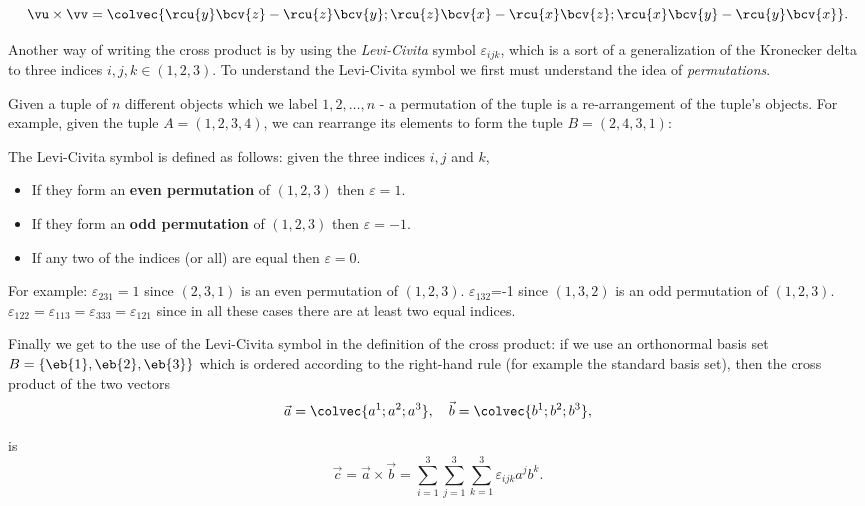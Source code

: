 \begin{equation}
  \vu\times\vv = \colvec{\rcu{y}\bcv{z}-\rcu{z}\bcv{y};\rcu{z}\bcv{x}-\rcu{x}\bcv{z};\rcu{x}\bcv{y}-\rcu{y}\bcv{x}}.
	\label{eq:cross product calculation}
\end{equation}

Another way of writing the cross product is by using the \emph{Levi-Civita} symbol $\varepsilon_{ijk}$, which is a sort of a generalization of the Kronecker delta to three indices $i,j,k\in\left(1,2,3\right)$. To understand the Levi-Civita symbol we first must understand the idea of \emph{permutations}.

Given a tuple of $n$ different objects which we label $1,2,\dots,n$ - a permutation of the tuple is a re-arrangement of the tuple's objects. For example, given the tuple $A=\left(1,2,3,4\right)$, we can rearrange its elements to form the tuple $B=\left(2,4,3,1\right)$:


The Levi-Civita symbol is defined as follows: given the three indices $i,j$ and $k$,
\begin{itemize}
  \item If they form an \textbf{even permutation} of $\left(1,2,3\right)$ then $\varepsilon=1$.
  \item If they form an \textbf{odd permutation} of $\left(1,2,3\right)$ then $\varepsilon=-1$.
  \item If any two of the indices (or all) are equal then $\varepsilon=0$.
\end{itemize}

For example: $\varepsilon_{231}=1$ since $\left(2,3,1\right)$ is an even permutation of $\left(1,2,3\right)$. $\varepsilon_{132}$=-1 since $(1,3,2)$ is an odd permutation of $(1,2,3)$. $\varepsilon_{122}=\varepsilon_{113}=\varepsilon_{333}=\varepsilon_{121}$ since in all these cases there are at least two equal indices.

Finally we get to the use of the Levi-Civita symbol in the definition of the cross product: if we use an orthonormal basis set $B=\left\{\eb{1},\eb{2},\eb{3}\right\}$ which is ordered according to the right-hand rule (for example the standard basis set), then the cross product of the two vectors
\[
  \vec{a}=\colvec{a^{1};a^{2};a^{3}},\quad\vec{b}=\colvec{b^{1};b^{2};b^{3}},
\]

is
\begin{equation}
  \vec{c} = \vec{a}\times\vec{b} = \sum\limits_{i=1}^{3}\sum\limits_{j=1}^{3}\sum\limits_{k=1}^{3}\varepsilon_{ijk}a^{j}b^{k}.
  \label{eq:cross_product_LCsymbol}
\end{equation}

